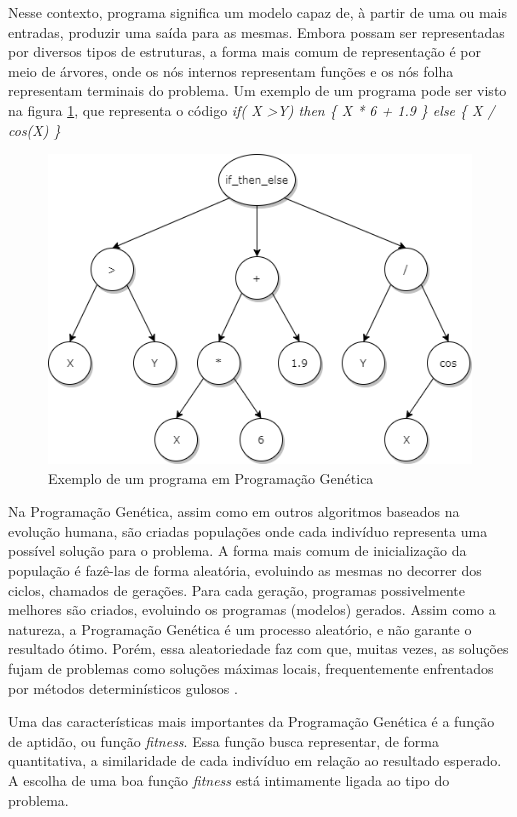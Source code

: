 \documentclass[12pt]{article}
\begin{document}
Nesse contexto, programa significa um modelo capaz de, à partir de uma ou mais entradas, produzir uma saída para as mesmas. Embora possam ser representadas por diversos tipos de estruturas, a forma mais comum de representação é por meio de árvores, onde os nós internos representam funções e os nós folha representam terminais do problema. Um exemplo de um programa pode ser visto na figura \ref{treeProgram}, que representa o código \emph{if( X \textgreater Y) then \{ X * 6 +  1.9 \} else \{ X / cos(X) \}}

\begin{figure}[!htb]
	\centering
	\includegraphics[width=1.0\textwidth]{treeGP}
	\caption{Exemplo de um programa em Programação Genética}
	\label{treeProgram}
\end{figure}

Na Programação Genética, assim como em outros algoritmos baseados na evolução humana, são criadas populações onde cada indivíduo representa uma possível solução para o problema. A forma mais comum de inicialização da população é fazê-las de forma aleatória, evoluindo as mesmas no decorrer dos ciclos, chamados de gerações. Para cada geração, programas possivelmente melhores são criados, evoluindo os programas (modelos) gerados. Assim como a natureza, a Programação Genética é um processo aleatório, e não garante o resultado ótimo. Porém, essa aleatoriedade faz com que, muitas vezes, as soluções fujam de problemas como soluções máximas locais, frequentemente enfrentados por métodos determinísticos gulosos \cite{mcphee2008field}.

Uma das características mais importantes da Programação Genética é a função de aptidão, ou função \emph{fitness}. Essa função busca representar, de forma quantitativa, a similaridade de cada indivíduo em relação ao resultado esperado. A escolha de uma boa função \emph{fitness} está intimamente ligada ao tipo do problema.
\end{document}
